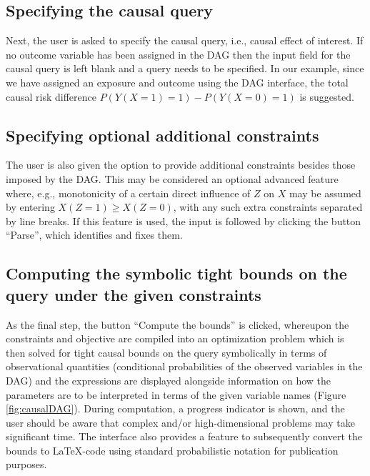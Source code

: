 \hypertarget{specifying-the-causal-query}{%
\subsection{Specifying the causal query}\label{specifying-the-causal-query}}

Next, the user is asked to specify the causal query, i.e., causal effect of interest.
If no outcome variable has been assigned in the DAG then the input field for the causal query is left blank and a query needs to be specified. In our example, since we have assigned an exposure and outcome using the DAG interface, the total causal risk difference \(P(Y(X=1)=1)-P(Y(X=0)=1)\) is suggested.

\hypertarget{specifying-optional-additional-constraints}{%
\subsection{Specifying optional additional constraints}\label{specifying-optional-additional-constraints}}

The user is also given the option to provide additional constraints besides those imposed by the DAG. This may be considered an optional advanced feature where, e.g., monotonicity of a certain direct influence of \(Z\) on \(X\) may be assumed by entering \(X(Z=1)\ge X(Z=0)\), with any such extra constraints separated by line breaks. If this feature is used, the input is followed by clicking the button ``Parse'', which identifies and fixes them.

\hypertarget{computing-the-symbolic-tight-bounds-on-the-query-under-the-given-constraints}{%
\subsection{Computing the symbolic tight bounds on the query under the given constraints}\label{computing-the-symbolic-tight-bounds-on-the-query-under-the-given-constraints}}

As the final step, the button ``Compute the bounds'' is clicked, whereupon the constraints and objective are compiled into an optimization problem which is then solved for tight causal bounds on the query symbolically in terms of observational quantities (conditional probabilities of the observed variables in the DAG) and the expressions are displayed alongside information on how the parameters are to be interpreted in terms of the given variable names (Figure \ref{fig:causalDAG}). During computation, a progress indicator is shown, and the user should be aware that complex and/or high-dimensional problems may take significant time. The interface also provides a feature to subsequently convert the bounds to \LaTeX-code using standard probabilistic notation for publication purposes.

